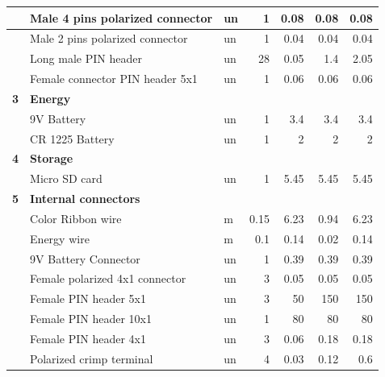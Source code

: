 \documentclass[12pt,letterpaper]{article}
\numberwithin{figure}{section}
\numberwithin{equation}{section}
\numberwithin{table}{section}
\begin{document}
\begin{appendices}
\begin{table}[]
{\begin{tabular}{|l|l|l|r|r|r|r|}
            & Male 4 pins polarized connector         & un     & 1      & 0.08     & 0.08    & 0.08    \\ \hline
            & Male 2 pins polarized connector         & un     & 1      & 0.04     & 0.04    & 0.04    \\ \hline
            & Long male PIN header                    & un     & 28     & 0.05     & 1.4     & 2.05    \\ \hline
            & Female connector PIN header 5x1         & un     & 1      & 0.06     & 0.06    & 0.06    \\ \hline
\textbf{3}  & \multicolumn{6}{l|}{\textbf{Energy}} \\ 
\hline
            & 9V Battery                              & un     & 1      & 3.4      & 3.4     & 3.4     \\ \hline
            & CR 1225 Battery                         & un     & 1      & 2        & 2       & 2       \\ \hline
\textbf{4}  & \multicolumn{6}{l|}{\textbf{Storage}} \\ 
\hline
            & Micro SD card                           & un     & 1      & 5.45     & 5.45    & 5.45    \\ \hline
\textbf{5}  & \multicolumn{6}{l|}{\textbf{Internal connectors}} \\ 
\hline
            & Color Ribbon wire                       & m      & 0.15   & 6.23     & 0.94    & 6.23    \\ \hline
            & Energy wire                             & m      & 0.1    & 0.14     & 0.02    & 0.14    \\ \hline
            & 9V Battery Connector                    & un     & 1      & 0.39     & 0.39    & 0.39    \\ \hline
            & Female polarized 4x1 connector          & un     & 3      & 0.05     & 0.05    & 0.05    \\ \hline
            & Female PIN header 5x1                   & un     & 3      & 50       & 150     & 150     \\ \hline
            & Female PIN header 10x1                  & un     & 1      & 80       & 80      & 80      \\ \hline
            & Female PIN header 4x1                   & un     & 3      & 0.06     & 0.18    & 0.18    \\ \hline
            & Polarized crimp terminal                & un     & 4      & 0.03     & 0.12    & 0.6     \\ \hline

\end{tabular}}
\end{table}
\end{appendices}
\end{document}
